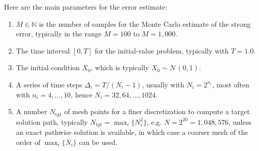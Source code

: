\documentclass[reqno,12pt]{amsart}
\theoremstyle{plain} %
\theoremstyle{definition} %
\begin{document}
Here are the main parameters for the error estimate:
\begin{enumerate}
    \item $M\in\mathbb{N}$ is the number of samples for the Monte Carlo estimate of the strong error, typically in the range $M=100$ to $M=1,000$.
    \item The time interval $[0, T]$ for the initial-value problem, typically with $T=1.0$.
    \item The initial condition $X_0$, which is typically $X_0 \sim \mathcal{N}(0, 1)$.
    \item A series of time steps $\Delta_i = T/(N_i-1)$, usually with $N_i=2^{n_i}$, most often with $n_i=4, \ldots, 10$, hence $N_i=32, 64, \ldots, 1024$.
    \item A number $N_{\mathrm{tgt}}$ of mesh points for a finer discretization to compute a target solution path, typically $N_{\mathrm{tgt}} = \max_i\{N_i^2\}$, e.g. $N=2^{20} = 1,048,576$, unless an exact pathwise solution is available, in which case a coarser mesh of the order of $\max_i\{N_i\}$ can be used.
\end{enumerate}
\end{document}
